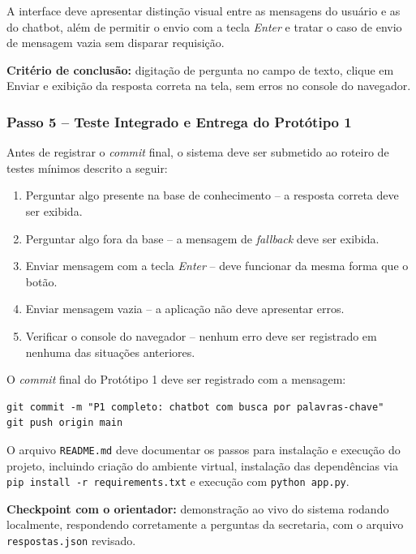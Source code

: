 A interface deve apresentar distinção visual entre as mensagens do usuário e as do chatbot, além de permitir o envio com a tecla \textit{Enter} e tratar o caso de envio de mensagem vazia sem disparar requisição.

\textbf{Critério de conclusão:} digitação de pergunta no campo de texto, clique em Enviar e exibição da resposta correta na tela, sem erros no console do navegador.

\subsubsection{Passo 5 -- Teste Integrado e Entrega do Protótipo 1}

Antes de registrar o \textit{commit} final, o sistema deve ser submetido ao roteiro de testes mínimos descrito a seguir:

\begin{enumerate}
    \item Perguntar algo presente na base de conhecimento -- a resposta correta deve ser exibida.
    \item Perguntar algo fora da base -- a mensagem de \textit{fallback} deve ser exibida.
    \item Enviar mensagem com a tecla \textit{Enter} -- deve funcionar da mesma forma que o botão.
    \item Enviar mensagem vazia -- a aplicação não deve apresentar erros.
    \item Verificar o console do navegador -- nenhum erro deve ser registrado em nenhuma das situações anteriores.
\end{enumerate}

O \textit{commit} final do Protótipo 1 deve ser registrado com a mensagem:

\begin{verbatim}
git commit -m "P1 completo: chatbot com busca por palavras-chave"
git push origin main
\end{verbatim}

O arquivo \texttt{README.md} deve documentar os passos para instalação e execução do projeto, incluindo criação do ambiente virtual, instalação das dependências via \texttt{pip install -r requirements.txt} e execução com \texttt{python app.py}.

\textbf{Checkpoint com o orientador:} demonstração ao vivo do sistema rodando localmente, respondendo corretamente a perguntas da secretaria, com o arquivo \texttt{respostas.json} revisado.

